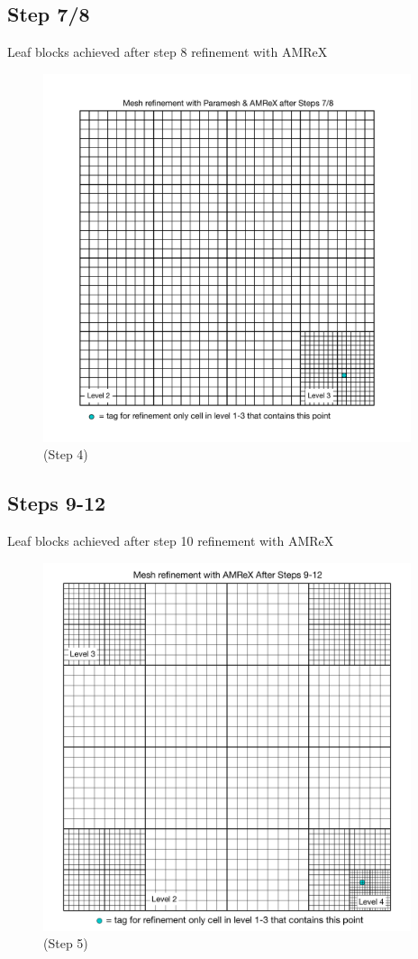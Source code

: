 \documentclass[12pt,letterpaper]{article}
\begin{document}
\newpage
\subsection{Step 7/8}
Leaf blocks achieved after step 8 refinement with AMReX
\begin{figure}[!hp]
\begin{center}
\includegraphics[width=4.25in]{TestRefine_Step8_Both.pdf}
\caption{(Step 4) }
\end{center}
\end{figure}

\newpage
\subsection{Steps 9-12}
Leaf blocks achieved after step 10 refinement with AMReX
\begin{figure}[!hp]
\begin{center}
\includegraphics[width=4.25in]{TestRefine_Step10_Both.pdf}
\caption{(Step 5) }
\end{center}
\end{figure}
\end{document}
